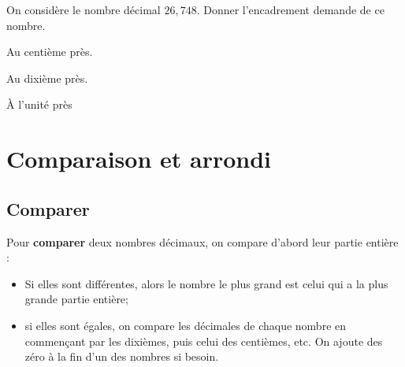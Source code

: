 \documentclass[a4paper]{book}
\begin{document}
    \begin{exemple}
        On considère le nombre décimal $26,748$. Donner l'encadrement demande de ce nombre.

        \medskip

        \begin{minipage}{0.30\linewidth}
            Au centième près.
            
            \vspace{2cm}
        \end{minipage}
        \hfill\vline\hfill
        \begin{minipage}{0.30\linewidth}
            Au dixième près.
            
            \vspace{2cm}
        \end{minipage}
        \hfill\vline\hfill
        \begin{minipage}{0.30\linewidth}
            À l'unité près
            
            \vspace{2cm}
        \end{minipage}
    \end{exemple}
        

\newpage


\section{Comparaison et arrondi}
\subsection{Comparer}
    \begin{propriete}[Comparer]
        Pour \textbf{comparer} deux nombres décimaux, on compare d'abord leur partie entière :
        \begin{itemize}
            \item Si elles sont différentes, alors le nombre le plus grand est celui qui a la plus grande partie entière;
            \item si elles sont égales, on compare les décimales de chaque nombre en commençant par les dixièmes, puis celui des centièmes, etc. On ajoute des zéro à la fin d'un des nombres si besoin.
        \end{itemize}
    \end{propriete}
\end{document}
